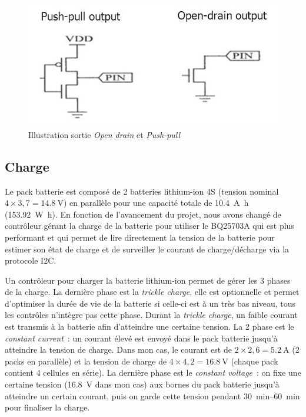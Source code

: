 \documentclass[a4paper, 12pt, sffamily]{report}
\begin{document}
\begin{figure}[H]
\centering
\includegraphics[scale=0.55]{figures/screenshots/opendrain_pushpull.png}
\caption{Illustration sortie \emph{Open drain} et \emph{Push-pull}} 
\label{fig:opendrain_pushpull}
\end{figure}

\subsection{Charge}
Le pack batterie est composé de 2 batteries lithium-ion 4S (tension nominal $4\times3,7=\SI{14.8}{\volt}$) en parallèle pour une capacité totale de \SI{10.4}{\ampere\hour} (\SI{153.92}{\watt\hour}). En fonction de l’avancement du projet, nous avons changé de contrôleur gérant la charge de la batterie pour utiliser le BQ25703A qui est plus performant et qui permet de lire directement la tension de la batterie pour estimer son état de charge et de surveiller le courant de charge/décharge via la protocole I2C.

Un contrôleur pour charger la batterie lithium-ion permet de gérer les 3 phases de la charge. La dernière phase est la \emph{trickle charge}, elle est optionnelle et permet d’optimiser la durée de vie de la batterie si celle-ci est à un très bas niveau, tous les contrôles n’intègre pas cette phase. Durant la \emph{trickle charge}, un faible courant est transmis à la batterie afin d’atteindre une certaine tension. La 2\ieme{} phase est le \emph{constant current}~: un courant élevé est envoyé dans le pack batterie jusqu’à atteindre la tension de charge. Dans mon cas, le courant est de $2\times2,6 = \SI{5.2}{\ampere}$ (2 packs en parallèle) et la tension de charge de $4\times4,2 = \SI{16.8}{\volt}$ (chaque pack contient 4 cellules en série). La dernière phase est le \emph{constant voltage}~: on fixe une certaine tension (\SI{16.8}{\volt} dans mon cas) aux bornes du pack batterie jusqu’à atteindre un certain courant, puis on garde cette tension pendant \SIrange{30}{60}{\minute} pour finaliser la charge.
\end{document}
